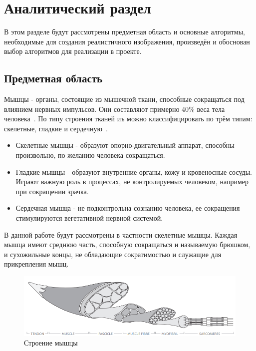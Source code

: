 \chapter{Аналитический раздел}
\label{cha:analysis}
 В этом разделе будут рассмотрены предметная область и основные алгоритмы, необходимые для создания реалистичного изображения, произведён и обоснован выбор алгоритмов для реализации в проекте.
\section{Предметная область}
\label{sec:item_ran}
Мышцы - органы, состоящие из мышечной ткани, способные сокращаться под влиянием нервных импульсов. Они составляют примерно 40\% веса тела человека~\cite{muscle_01}. По типу строения тканей иъ можно классифицировать по трём типам: скелетные, гладкие и сердечную~\cite{muscle_02}.
\begin{itemize}
	\item Скелетные мышцы - образуют опорно-двигательный аппарат, способны произвольно, по желанию человека сокращаться.
	\item Гладкие мышцы - образуют внутренние органы, кожу и кровеносные сосуды. Играют важную роль в процессах, не контролируемых человеком, например при сокращении зрачка.
	\item Сердечная мышца - не подконтрольна сознанию человека, ее сокращения стимулируются вегетативной нервной системой.
\end{itemize}
В данной работе будут рассмотрены в частности скелетные мышцы. Каждая мышца имеют среднюю часть, способную сокращаться и называемую брюшком, и сухожильные концы, не обладающие сократимостью и служащие для прикрепления мышц.
\begin{figure}
	\centering
	\includegraphics[width=0.7\linewidth]{muscle_struct}
	\caption[Строение мышцы]{Строение мышцы}
	\label{fig:musclestruct}
\end{figure}

